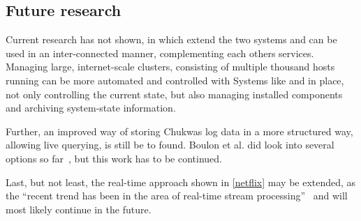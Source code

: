 \subsection{Future research}
Current research has not shown, in which extend the two systems \amblong and \chuk can be used in an inter-connected manner, complementing each others services. 
Managing large, internet-scale clusters, consisting of multiple thousand hosts running \hadooplong can be more automated and controlled with Systems like \amb and \chuk in place, not only controlling the current state, but also managing installed components and archiving system-state information.

Further, an improved way of storing Chukwas log data in a more structured way, allowing live querying, is still be to found. Boulon et al. did look into several options so far~\cite{Boulonb}, but this work has to be continued.

Last, but not least, the real-time approach shown in \ref{netflix} may be extended, as the ``recent trend has been in the area of real-time stream processing''~\cite{Bae2013} and will most likely continue in the future.